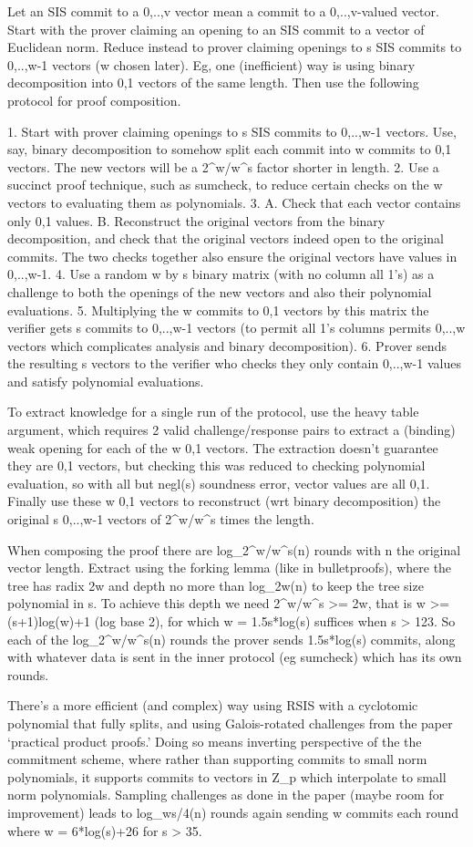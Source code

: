 
Let an SIS commit to a {0,..,v} vector mean a commit to a {0,..,v}-valued vector.
Start with the prover claiming an opening to an SIS commit to a vector of Euclidean norm.
Reduce instead to prover claiming openings to s SIS commits to {0,..,w-1} vectors (w chosen later).
Eg, one (inefficient) way is using binary decomposition into {0,1} vectors of the same length.
Then use the following protocol for proof composition.

1.
Start with prover claiming openings to s SIS commits to {0,..,w-1} vectors.
Use, say, binary decomposition to somehow split each commit into w commits to {0,1} vectors.
The new vectors will be a 2^w/w^s factor shorter in length.
2.
Use a succinct proof technique, such as sumcheck, to reduce certain checks on the w vectors to evaluating them as polynomials.
3.
A. Check that each vector contains only {0,1} values.
B. Reconstruct the original vectors from the binary decomposition, and check that the original vectors indeed open to the original commits.
The two checks together also ensure the original vectors have values in {0,..,w-1}.
4.
Use a random w by s binary matrix (with no column all 1's) as a challenge to both the openings of the new vectors and also their polynomial evaluations.
5.
Multiplying the w commits to {0,1} vectors by this matrix the verifier gets s commits to {0,..,w-1} vectors (to permit all 1's columns permits {0,..,w} vectors which complicates analysis and binary decomposition).
6.
Prover sends the resulting s vectors to the verifier who checks they only contain {0,..,w-1} values and satisfy polynomial evaluations.

To extract knowledge for a single run of the protocol, use the heavy table argument, which requires 2 valid challenge/response pairs to extract a (binding) weak opening for each of the w {0,1} vectors.
The extraction doesn't guarantee they are {0,1} vectors, but checking this was reduced to checking polynomial evaluation, so with all but negl(s) soundness error, vector values are all {0,1}.
Finally use these w {0,1} vectors to reconstruct (wrt binary decomposition) the original s {0,..,w-1} vectors of 2^w/w^s times the length.

When composing the proof there are log_{2^w/w^s}(n) rounds with n the original vector length.
Extract using the forking lemma (like in bulletproofs), where the tree has radix 2w and depth no more than log_{2w}(n) to keep the tree size polynomial in s.
To achieve this depth we need 2^w/w^s >= 2w, that is w >= (s+1)log(w)+1 (log base 2), for which w = 1.5s*log(s) suffices when s > 123.
So each of the log_{2^w/w^s}(n) rounds the prover sends 1.5s*log(s) commits, along with whatever data is sent in the inner protocol (eg sumcheck) which has its own rounds.

There's a more efficient (and complex) way using RSIS with a cyclotomic polynomial that fully splits, and using Galois-rotated challenges from the paper `practical product proofs.'
Doing so means inverting perspective of the the commitment scheme, where rather than supporting commits to small norm polynomials, it supports commits to vectors in Z_p which interpolate to small norm polynomials.
Sampling challenges as done in the paper (maybe room for improvement) leads to log_{ws/4}(n) rounds again sending w commits each round where w = 6*log(s)+26 for s > 35.
